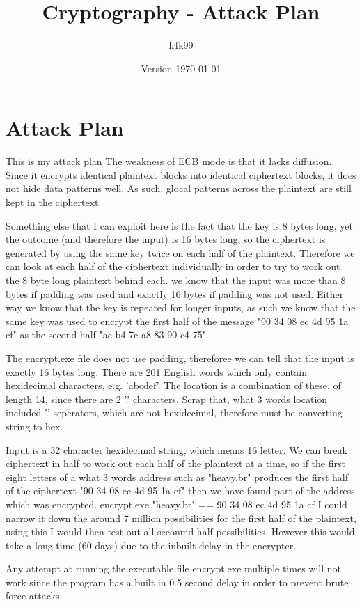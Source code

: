 \documentclass[a4paper, 11pt]{article}
\title{Cryptography - Attack Plan}
\date{Version \today}
\author{lrfk99}
\begin{document}
\maketitle

\section{Attack Plan}

This is my attack plan
The weakness of ECB mode is that it lacks diffusion. Since it encrypts identical plaintext blocks into 
identical ciphertext blocks, it does not hide data patterns well. 
As such, glocal patterns across the plaintext are still kept in the ciphertext.

Something else that I can exploit here is the fact that the key is 8 bytes long, 
yet the outcome (and therefore the input) is 16 bytes long, 
so the ciphertext is generated by using the same key twice on each half of the plaintext.
Therefore we can look at each half of the ciphertext individually in order to try to work out the 8 byte long plaintext behind each.
we know that the input was more than 8 bytes if padding was used 
and exactly 16 bytes if padding was not used.
Either way we know that the key is repeated for longer inputs, as such we know that the same key was used to 
encrypt the first half of the message "90 34 08 ec 4d 95 1a cf" as the second half "ae b4 7c a8 83 90 c4 75".

The encrypt.exe file does not use padding, thereforee we can tell that the input is exactly 16 bytes long.
There are 201 English words which only contain hexidecimal characters, e.g. 'abcdef'. The location is a combination of these, 
of length 14, since there are 2 '.' characters.
Scrap that, what 3 words location included '.' seperators, which are not hexidecimal, therefore must be converting string to hex.


Input is a 32 character hexidecimal string, which means 16 letter.
We can break ciphertext in half to work out each half of the plaintext at a time, so if the first eight letters of a what 3 words 
address such as "heavy.br" produces the first half of the ciphertext "90 34 08 ec 4d 95 1a cf" then we have found part of the 
address which was encrypted.
encrypt.exe "heavy.br" == 90 34 08 ec 4d 95 1a cf 
I could narrow it down the around 7 million possibilities for the first half of the plaintext, using this I would then 
test out all seconmd half possibilities. However this would take a long time (60 days) due to the inbuilt delay in the encrypter.

Any attempt at running the executable file encrypt.exe multiple times will not work since the program has a built in 
0.5 second delay in order to prevent brute force attacks.
\end{document}
